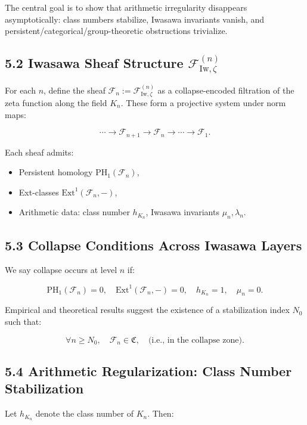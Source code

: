 \documentclass[11pt]{article}
\begin{document}
The central goal is to show that arithmetic irregularity disappears asymptotically: class numbers stabilize, Iwasawa invariants vanish, and persistent/categorical/group-theoretic obstructions trivialize.

\subsection*{5.2 Iwasawa Sheaf Structure \( \mathcal{F}_{\mathrm{Iw}, \zeta}^{(n)} \)}

For each \( n \), define the sheaf \( \mathcal{F}_n := \mathcal{F}_{\mathrm{Iw}, \zeta}^{(n)} \) as a collapse-encoded filtration of the zeta function along the field \( K_n \). These form a projective system under norm maps:

\[
\cdots \longrightarrow \mathcal{F}_{n+1} \longrightarrow \mathcal{F}_n \longrightarrow \cdots \longrightarrow \mathcal{F}_1.
\]

Each sheaf admits:

\begin{itemize}
  \item Persistent homology \( \mathrm{PH}_1(\mathcal{F}_n) \),
  \item Ext-classes \( \mathrm{Ext}^1(\mathcal{F}_n, -) \),
  \item Arithmetic data: class number \( h_{K_n} \), Iwasawa invariants \( \mu_n, \lambda_n \).
\end{itemize}

\subsection*{5.3 Collapse Conditions Across Iwasawa Layers}

We say collapse occurs at level \( n \) if:

\[
\mathrm{PH}_1(\mathcal{F}_n) = 0, \quad \mathrm{Ext}^1(\mathcal{F}_n, -) = 0, \quad h_{K_n} = 1, \quad \mu_n = 0.
\]

Empirical and theoretical results suggest the existence of a stabilization index \( N_0 \) such that:

\[
\forall n \geq N_0, \quad \mathcal{F}_n \in \mathfrak{C}, \quad \text{(i.e., in the collapse zone)}.
\]

\subsection*{5.4 Arithmetic Regularization: Class Number Stabilization}

Let \( h_{K_n} \) denote the class number of \( K_n \). Then:
\end{document}
